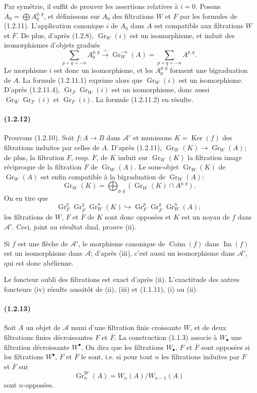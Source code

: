\documentclass[10pt]{article}
\newcommand{\Gr}{\operatorname{Gr}}
\newcommand{\Ker}{\operatorname{Ker}}
\newcommand{\Coim}{\operatorname{Coim}}
\newcommand{\Imop}{\operatorname{Im}}
\newcommand{\fg}{\guillemotright}
\newcommand{\og}{\guillemotleft}
\newcommand{\calA}{\mathcal A}
\newcommand{\iso}{\xrightarrow{\sim}}
\begin{document}
Par symétrie, il suffit de prouver les assertions relatives à $i=0$. Posons $A_0=\bigoplus A_0^{p,q}$, et définissons sur $A_0$ des filtrations $W$ et $F$ par les formules de (1.2.11). L'application canonique $i$ de $A_0$ dans $A$ est compatible aux filtrations $W$ et $F$. De plus, d'après (1.2.8), $\Gr_W(i)$ est un isomorphisme, et induit des isomorphismes d'objets gradués
\[
\tag{1.2.11.4}
\sum_{p+q=-n} A_0^{p,q}\iso \Gr_W^{-n}(A)=\sum_{p+q=-n}A^{p,q}.
\]
Le morphisme $i$ est donc un isomorphisme, et les $A_0^{p,q}$ forment une bigraduation de $A$. La formule (1.2.11.1) exprime alors que $\Gr_W(i)$ est un isomorphisme. D'après (1.2.11.4), $\Gr_F\Gr_W(i)$ est un isomorphisme, donc aussi $\Gr_W\Gr_F(i)$ et $\Gr_F(i)$. La formule (1.2.11.2) en résulte.

\paragraph{(1.2.12)} Prouvons (1.2.10). Soit $f:A\to B$ dans $\calA'$ et munissons $K=\Ker(f)$ des filtrations induites par celles de $A$. D'après (1.2.11), $\Gr_W(K)\to\Gr_W(A)$; de plus, la filtration $F$, resp. $\overline F$, de $K$ induit sur $\Gr_W(K)$ la filtration image réciproque de la filtration $F$ de $\Gr_W(A)$. Le sous-objet $\Gr_W(K)$ de $\Gr_W(A)$ est enfin compatible à la bigraduation de $\Gr_W(A)$:
\[
\Gr_W(K)=\bigoplus_{p,q}(\Gr_W(K)\cap A^{p,q}).
\]
On en tire que
\[
\Gr_F^p\Gr_{\overline F}^{q}\Gr_W^n(K)\hookrightarrow \Gr_F^p\Gr_{\overline F}^{q}\Gr_W^n(A);
\]
les filtrations de $W$, $F$ et $\overline F$ de $K$ sont donc opposées et $K$ est un noyau de $f$ dans $\calA'$. Ceci, joint au résultat dual, prouve (ii).

Si $f$ est une flèche de $\calA'$, le morphisme canonique de $\Coim(f)$ dans $\Imop(f)$ est un isomorphisme dans $\calA$; d'après (iii), c'est aussi un isomorphisme dans $\calA'$, qui est donc abélienne.

Le foncteur \og oubli des filtrations\fg{} est exact d'après (ii). L'exactitude des autres foncteurs (iv) résulte aussitôt de (ii), (iii) et (1.1.11), (i) ou (ii).

\paragraph{(1.2.13)} Soit $A$ un objet de $\calA$ muni d'une filtration finie croissante $W$, et de deux filtrations finies décroissantes $F$ et $\overline F$. La construction (1.1.3) associe à $W_\bullet$ une filtration décroissante $W^\bullet$. On dira que les filtrations $W_\bullet$, $F$ et $\overline F$ sont opposées si les filtrations $W^\bullet$, $F$ et $\overline F$ le sont, i.e. si pour tout $n$ les filtrations induites par $F$ et $\overline F$ sur
\[
\Gr_n^W(A)=W_n(A)/W_{n-1}(A)
\]
sont $n$-opposées.
\end{document}
